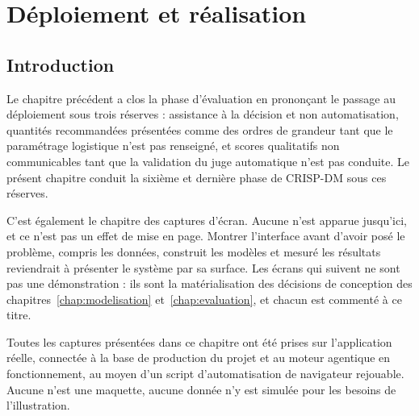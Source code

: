 %

\chapter{Déploiement et réalisation}
\label{chap:deploiement}
\minitocsection
\newpage

\section*{Introduction}

Le chapitre précédent a clos la phase d'évaluation en prononçant le passage au déploiement sous trois réserves : assistance à la décision et non automatisation, quantités recommandées présentées comme des ordres de grandeur tant que le paramétrage logistique n'est pas renseigné, et scores qualitatifs non communicables tant que la validation du juge automatique n'est pas conduite. Le présent chapitre conduit la sixième et dernière phase de CRISP-DM sous ces réserves.

C'est également le chapitre des captures d'écran. Aucune n'est apparue jusqu'ici, et ce n'est pas un effet de mise en page. Montrer l'interface avant d'avoir posé le problème, compris les données, construit les modèles et mesuré les résultats reviendrait à présenter le système par sa surface. Les écrans qui suivent ne sont pas une démonstration : ils sont la matérialisation des décisions de conception des chapitres~\ref{chap:modelisation} et~\ref{chap:evaluation}, et chacun est commenté à ce titre.

Toutes les captures présentées dans ce chapitre ont été prises sur l'application réelle, connectée à la base de production du projet et au moteur agentique en fonctionnement, au moyen d'un script d'automatisation de navigateur rejouable. Aucune n'est une maquette, aucune donnée n'y est simulée pour les besoins de l'illustration.

